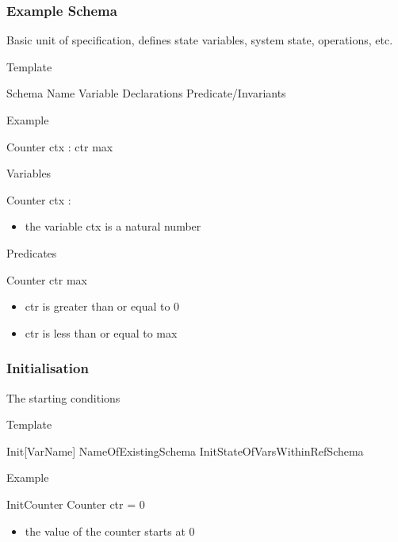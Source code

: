 \documentclass{article}
\begin{document}
\subsubsection{Example Schema}
Basic unit of specification, defines state variables, system state, operations, etc.
\begin{paragraph}{Template}
\begin{schema}{Schema Name}
  Variable Declarations
  \where
  Predicate/Invariants
\end{schema}
\end{paragraph}
\begin{paragraph}{Example}
  \begin{schema}{Counter}
  ctx : \nat
   \leq ctr \leq max
\end{schema}
\begin{paragraph}{Variables}
  \begin{schema}{Counter}
    ctx : \nat
    \where
\end{schema}
\begin{itemize}
\item the variable ctx is a natural number
\end{itemize}
\end{paragraph}
\begin{paragraph}{Predicates}
  \begin{schema}{Counter}
   \leq ctr \leq max
\end{schema}
  \begin{itemize}
  \item ctr is greater than or equal to 0
  \item ctr is less than or equal to max
  \end{itemize}
\end{paragraph}
\end{paragraph}

\subsubsection{Initialisation}
The starting conditions
\begin{paragraph}{Template}
\begin{schema}{Init[VarName]}
  NameOfExistingSchema
  \where
  InitStateOfVarsWithinRefSchema
\end{schema}
\end{paragraph}
\begin{paragraph}{Example}
  \begin{schema}{InitCounter}
    Counter
    \where
    ctr = 0
  \end{schema}
  \begin{itemize}
    \item the value of the counter starts at 0
  \end{itemize}
\end{paragraph}
\end{document}
